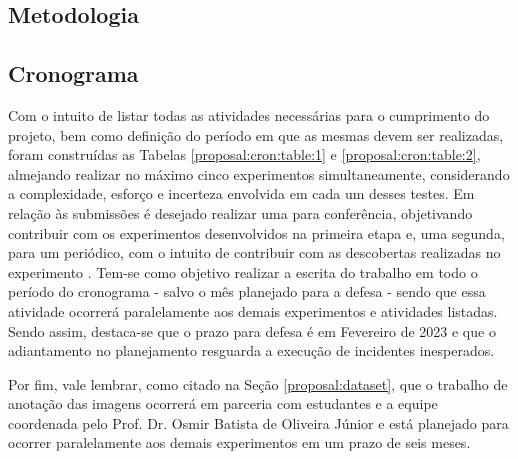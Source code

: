 \subsection{Metodologia}


\subsection{Cronograma}
\label{proposal:cron}
Com o intuito de listar todas as atividades necessárias para o cumprimento do projeto, bem como definição do período em que as mesmas devem ser realizadas, foram construídas as Tabelas \ref{proposal:cron:table:1} e \ref{proposal:cron:table:2}, almejando realizar no máximo cinco  experimentos simultaneamente, considerando a complexidade, esforço e incerteza envolvida em cada um desses testes. Em relação às submissões é desejado realizar uma para conferência, objetivando  contribuir com os experimentos desenvolvidos na primeira etapa e, uma segunda, para um periódico, com o intuito de contribuir com as descobertas realizadas no experimento . Tem-se como objetivo realizar a escrita do trabalho em todo o período do cronograma - salvo o mês planejado para a defesa - sendo que essa atividade ocorrerá paralelamente aos demais experimentos e atividades listadas. Sendo assim, destaca-se que o prazo para defesa é em Fevereiro de 2023 e que o adiantamento no planejamento resguarda a execução de incidentes inesperados.

Por fim, vale lembrar, como citado na Seção \ref{proposal:dataset}, que o trabalho de anotação das imagens ocorrerá em parceria com estudantes e a equipe coordenada pelo Prof. Dr. Osmir Batista de Oliveira Júnior e está planejado para ocorrer paralelamente aos demais experimentos em um prazo de seis meses.


